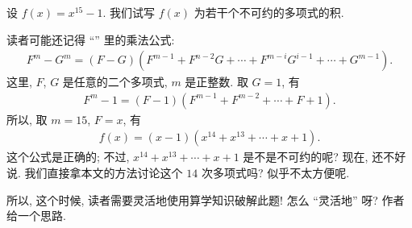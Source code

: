 \begin{example}
    设 $f(x) = x^{15}-1$. 我们试写 $f(x)$ 为若干个不可约的多项式的积.

    读者可能还记得 ``\SyntheticDivision '' 里的乘法公式:
    \begin{align*}
        F^m - G^m = (F - G)(F^{m-1} + F^{n-2} G + \cdots + F^{m-i} G^{i-1} + \cdots + G^{m-1}).
    \end{align*}
    这里, $F$, $G$ 是任意的二个多项式, $m$ 是正整数. 取 $G = 1$, 有
    \begin{align*}
        F^m - 1 = (F - 1)(F^{m-1} + F^{m-2} + \cdots + F + 1). \tag*{(D)}
    \end{align*}
    所以, 取 $m = 15$, $F = x$, 有
    \begin{align*}
        f(x) = (x - 1)(x^{14} + x^{13} + \cdots + x + 1).
    \end{align*}
    这个公式是正确的; 不过, $x^{14} + x^{13} + \cdots + x + 1$ 是不是不可约的呢? 现在, 还不好说. 我们直接拿本文的方法讨论这个 $14$ 次多项式吗? 似乎不太方便呢.

    所以, 这个时候, 读者需要灵活地使用算学知识破解此题! 怎么 ``灵活地'' 呀? 作者给一个思路.


\end{example}

